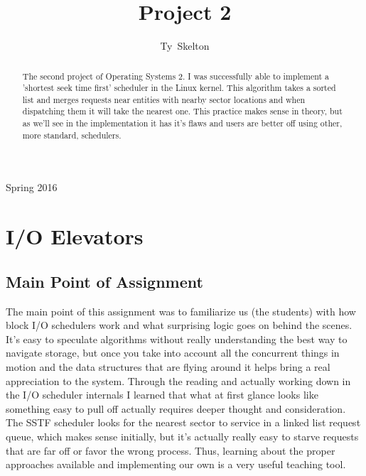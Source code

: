 \documentclass[10pt,draftclsnofoot,onecolumn]{IEEEtran}
\begin{document}
\singlespacing
\title{Project 2}

\author{Ty~Skelton}


%
{Spring 2016}

\maketitle

\begin{abstract}
The second project of Operating Systems 2.
I was successfully able to implement a 'shortest seek time first' scheduler in the Linux kernel.
This algorithm takes a sorted list and merges requests near entities with nearby sector locations and when dispatching them it will take the nearest one.
This practice makes sense in theory, but as we'll see in the implementation it has it's flaws and users are better off using other, more standard, schedulers.


\end{abstract}
\IEEEpeerreviewmaketitle

\newpage
{}

\tableofcontents
\newpage


\section{I/O Elevators}
\subsection{Main Point of Assignment}
The main point of this assignment was to familiarize us (the students) with how block I/O schedulers work and what surprising logic goes on behind the scenes.
It's easy to speculate algorithms without really understanding the best way to navigate storage, but once you take into account all the concurrent things in motion and the data structures that are flying around it helps bring a real appreciation to the system.
Through the reading and actually working down in the I/O scheduler internals I learned that what at first glance looks like something easy to pull off actually requires deeper thought and consideration.
The SSTF scheduler looks for the nearest sector to service in a linked list request queue, which makes sense initially, but it's actually really easy to starve requests that are far off or favor the wrong process.
Thus, learning about the proper approaches available and implementing our own is a very useful teaching tool.
\end{document}
